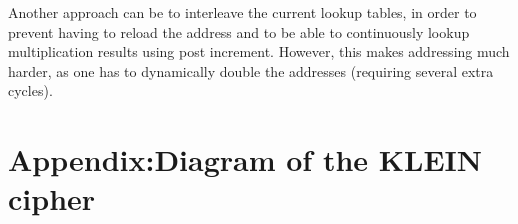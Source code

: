 \documentclass[a4paper]{article}
\begin{document}
Another approach can be to interleave the current lookup tables, in order to prevent having to reload the address and to be able to continuously lookup multiplication results using post increment. However, this makes addressing much harder, as one has to dynamically double the addresses (requiring several extra cycles).





\appendix

\hypertarget{appendix}{}
\section*{Appendix:\hspace{1em}Diagram of the KLEIN cipher}

\begin{center}
\end{center}
\end{document}
